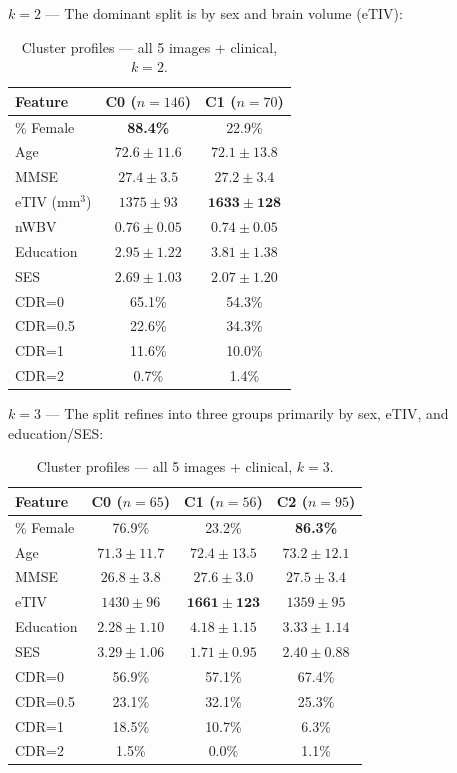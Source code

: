 \documentclass[12pt, a4paper]{article}
\begin{document}
\textbf{$k=2$} — The dominant split is by sex and brain volume (eTIV):

\begin{table}[H]
\centering
\caption{Cluster profiles — all 5 images + clinical, $k=2$.}
\begin{tabular}{lcc}
\toprule
\textbf{Feature} & \textbf{C0 ($n=146$)} & \textbf{C1 ($n=70$)} \\
\midrule
\% Female & \textbf{88.4\%} & 22.9\% \\
Age & $72.6 \pm 11.6$ & $72.1 \pm 13.8$ \\
MMSE & $27.4 \pm 3.5$ & $27.2 \pm 3.4$ \\
eTIV (mm$^3$) & $1375 \pm 93$ & $\mathbf{1633 \pm 128}$ \\
nWBV & $0.76 \pm 0.05$ & $0.74 \pm 0.05$ \\
Education & $2.95 \pm 1.22$ & $3.81 \pm 1.38$ \\
SES & $2.69 \pm 1.03$ & $2.07 \pm 1.20$ \\
\midrule
CDR=0 & 65.1\% & 54.3\% \\
CDR=0.5 & 22.6\% & 34.3\% \\
CDR=1 & 11.6\% & 10.0\% \\
CDR=2 & 0.7\% & 1.4\% \\
\bottomrule
\end{tabular}
\end{table}

\textbf{$k=3$} — The split refines into three groups primarily by sex, eTIV, and education/SES:

\begin{table}[H]
\centering
\caption{Cluster profiles — all 5 images + clinical, $k=3$.}
\begin{tabular}{lccc}
\toprule
\textbf{Feature} & \textbf{C0 ($n=65$)} & \textbf{C1 ($n=56$)} & \textbf{C2 ($n=95$)} \\
\midrule
\% Female & 76.9\% & 23.2\% & \textbf{86.3\%} \\
Age & $71.3 \pm 11.7$ & $72.4 \pm 13.5$ & $73.2 \pm 12.1$ \\
MMSE & $26.8 \pm 3.8$ & $27.6 \pm 3.0$ & $27.5 \pm 3.4$ \\
eTIV & $1430 \pm 96$ & $\mathbf{1661 \pm 123}$ & $1359 \pm 95$ \\
Education & $2.28 \pm 1.10$ & $\mathbf{4.18 \pm 1.15}$ & $3.33 \pm 1.14$ \\
SES & $3.29 \pm 1.06$ & $\mathbf{1.71 \pm 0.95}$ & $2.40 \pm 0.88$ \\
\midrule
CDR=0 & 56.9\% & 57.1\% & 67.4\% \\
CDR=0.5 & 23.1\% & 32.1\% & 25.3\% \\
CDR=1 & 18.5\% & 10.7\% & 6.3\% \\
CDR=2 & 1.5\% & 0.0\% & 1.1\% \\
\bottomrule
\end{tabular}
\end{table}
\end{document}

